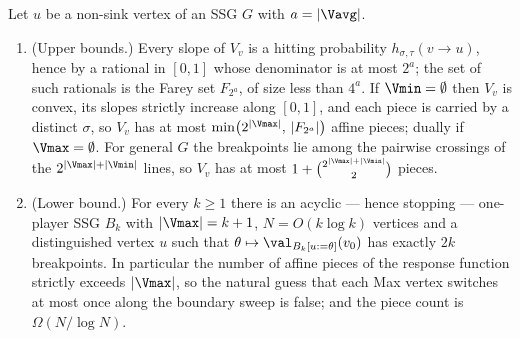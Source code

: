 \begin{theorem}\label{thm:bv-pieces}
Let $u$ be a non-sink vertex of an SSG $G$ with $a=|\Vavg|$.
\begin{enumerate}[label=(\alph*),leftmargin=2.2em]
\item \textup{(Upper bounds.)} Every slope of $V_v$ is a hitting
  probability $h_{\sigma,\tau}(v\to u)$, hence by
   a rational in $[0,1]$ whose denominator is
  at most $2^{a}$; the set of such rationals is the Farey set
  $F_{2^{a}}$, of size less than $4^{a}$. If $\Vmin=\emptyset$ then $V_v$
  is convex, its slopes strictly increase along $[0,1]$, and each piece is
  carried by a distinct $\sigma$, so $V_v$ has at most
  $\min\bigl(2^{|\Vmax|},\,|F_{2^{a}}|\bigr)$ affine pieces; dually if
  $\Vmax=\emptyset$. For general $G$ the breakpoints lie among the
  pairwise crossings of the $2^{|\Vmax|+|\Vmin|}$ lines, so $V_v$ has at
  most $1+\binom{2^{|\Vmax|+|\Vmin|}}{2}$ pieces.
\item \textup{(Lower bound.)} For every $k\ge1$ there is an acyclic ---
  hence stopping --- one-player SSG $B_k$ with $|\Vmax|=k+1$,
  $N=O(k\log k)$ vertices and a distinguished vertex $u$ such that
  $\theta\mapsto\val_{B_k[u:=\theta]}(v_0)$ has exactly $2k$ breakpoints.
  In particular the number of affine pieces of the response function
  strictly exceeds $|\Vmax|$, so the natural guess that each Max vertex
  switches at most once along the boundary sweep is false; and the piece
  count is $\Omega(N/\log N)$.
\end{enumerate}
\end{theorem}

